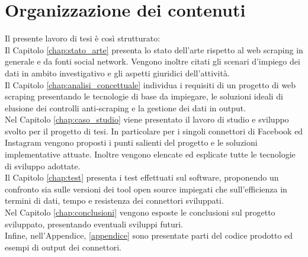 \section{Organizzazione dei contenuti}
Il presente lavoro di tesi \`e cos\`i strutturato: \\
Il Capitolo \ref{chap:stato_arte} presenta lo stato dell'arte rispetto al web scraping in generale e da fonti social network. Vengono inoltre citati gli scenari d'impiego dei dati in ambito investigativo e gli aspetti giuridici dell'attivit\`a. \\
Il Capitolo \ref{chap:analisi_concettuale} individua i requisiti di un progetto di web scraping presentando le tecnologie di base da impiegare, le soluzioni ideali di elusione dei controlli anti-scraping e la gestione dei dati in output.\\
Nel Capitolo \ref{chap:caso_studio} viene presentato il lavoro di studio e sviluppo svolto per il progetto di tesi. In particolare per i singoli connettori di Facebook ed Instagram vengono proposti i punti salienti del progetto e le soluzioni implementative attuate. Inoltre vengono elencate ed esplicate tutte le tecnologie di sviluppo adottate.\\
Il Capitolo \ref{chap:test} presenta i test effettuati sul software, proponendo un confronto sia sulle versioni dei tool open source impiegati che sull'efficienza in termini di dati, tempo e resistenza dei connettori sviluppati.\\
Nel Capitolo \ref{chap:conclusioni} vengono esposte le conclusioni sul progetto sviluppato, presentando eventuali sviluppi futuri. \\
Infine, nell'Appendice, \ref{appendice} sono presentate parti del codice prodotto ed esempi di output dei connettori. \\

